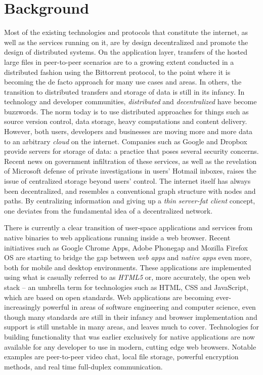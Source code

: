 \section{Background}
Most of the existing technologies and protocols that constitute the internet, as well as the services running on it, are by design decentralized and promote the design of distributed systems. On the application layer, transfers of the hosted large files in peer-to-peer scenarios are to a growing extent conducted in a distributed fashion using the Bittorrent protocol, to the point where it is becoming the de facto approach for many use cases and areas. In others, the transition to distributed transfers and storage of data is still in its infancy. In technology and developer communities, \emph{distributed} and \emph{decentralized} have become buzzwords. The norm today is to use distributed approaches for things such as source version control, data storage, heavy computations and content delivery.
However, both users, developers and businesses are moving more and more data to an arbitrary \emph{cloud} on the internet. Companies such as Google and Dropbox provide servers for storage of data: a practice that poses several security concerns. Recent news on government infiltration of these services, as well as the revelation of Microsoft  defense of private investigations in users' Hotmail inboxes, raises the issue of centralized storage beyond users' control. The internet itself has always been decentralized, and resembles a conventional graph structure with nodes and paths. By centralizing information and giving up a \emph{thin server-fat client} concept, one deviates from the fundamental idea of a decentralized network.

There is currently a clear transition of user-space applications and services from native binaries to web applications running inside a web browser. Recent initiatives such as Google Chrome Apps, Adobe Phonegap and Mozilla Firefox OS are starting to bridge the gap between \emph{web apps} and \emph{native apps} even more, both for mobile and desktop environments. These applications are implemented using what is casually referred to as \emph{HTML5} or, more accurately, the open web stack – an umbrella term for technologies such as HTML, CSS and JavaScript, which are based on open standards. Web applications are becoming ever-increasingly powerful in areas of software engineering and computer science, even though many standards are still in their infancy and browser implementation and support is still unstable in many areas, and leaves much to cover. Technologies for building functionality that was earlier exclusively for native applications are now available for any developer to use in modern, cutting edge web browsers. Notable examples are peer-to-peer video chat, local file storage, powerful encryption methods, and real time full-duplex communication.

